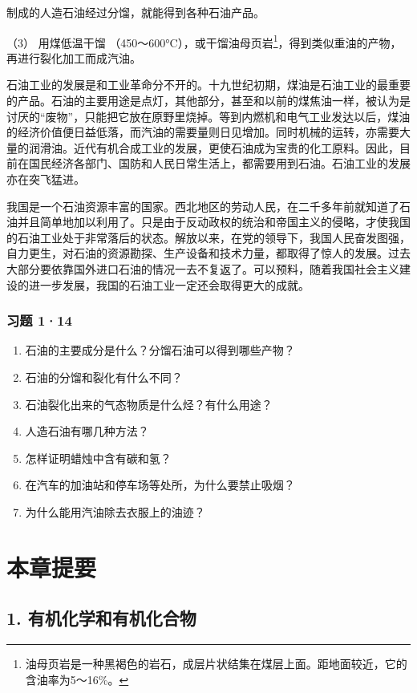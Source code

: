 制成的人造石油经过分馏，就能得到各种石油产品。

（3） 用煤低温干馏
（450～600°C），或干馏油母页岩\footnote{油母页岩是一种黑褐色的岩石，成层片状结集在煤层上面。距地面较近，它的含油率为5～16\%。}，得到类似重油的产物，再进行裂化加工而成汽油。

石油工业的发展是和工业革命分不开的。十九世纪初期，煤油是石油工业的最重要的产品。石油的主要用途是点灯，其他部分，甚至和以前的煤焦油一样，被认为是讨厌的``废物''，只能把它放在原野里烧掉。等到内燃机和电气工业发达以后，煤油的经济价值便日益低落，而汽油的需要量则日见增加。同时机械的运转，亦需要大量的润滑油。近代有机合成工业的发展，更使石油成为宝贵的化工原料。因此，目前在国民经济各部门、国防和人民日常生活上，都需要用到石油。石油工业的发展亦在突飞猛进。

我国是一个石油资源丰富的国家。西北地区的劳动人民，在二千多年前就知道了石油并且简单地加以利用了。只是由于反动政权的统治和帝国主义的侵略，才使我国的石油工业处于非常落后的状态。解放以来，在党的领导下，我国人民奋发图强，自力更生，对石油的资源勘探、生产设备和技术力量，都取得了惊人的发展。过去大部分要依靠国外进口石油的情况一去不复返了。可以预料，随着我国社会主义建设的进一步发展，我国的石油工业一定还会取得更大的成就。

\subsubsection{习题 1·14}

\begin{enumerate}
\item
  石油的主要成分是什么？分馏石油可以得到哪些产物？
\item
  石油的分馏和裂化有什么不同？
\item
  石油裂化出来的气态物质是什么烃？有什么用途？
\item
  人造石油有哪几种方法？
\item
  怎样证明蜡烛中含有碳和氢？
\item
  在汽车的加油站和停车场等处所，为什么要禁止吸烟？
\item
  为什么能用汽油除去衣服上的油迹？
\end{enumerate}

\section{本章提要}

\subsection{1. 有机化学和有机化合物}


